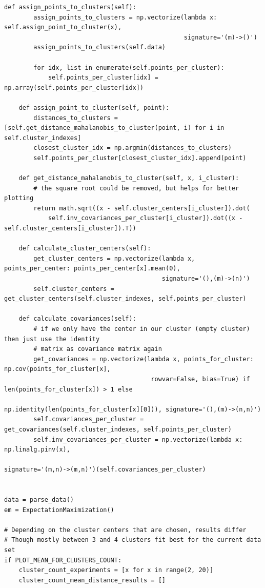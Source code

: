 \begin{lstlisting}[style=py]
    def assign_points_to_clusters(self):
        assign_points_to_clusters = np.vectorize(lambda x: self.assign_point_to_cluster(x),
                                                 signature='(m)->()')
        assign_points_to_clusters(self.data)

        for idx, list in enumerate(self.points_per_cluster):
            self.points_per_cluster[idx] = np.array(self.points_per_cluster[idx])

    def assign_point_to_cluster(self, point):
        distances_to_clusters = [self.get_distance_mahalanobis_to_cluster(point, i) for i in self.cluster_indexes]
        closest_cluster_idx = np.argmin(distances_to_clusters)
        self.points_per_cluster[closest_cluster_idx].append(point)

    def get_distance_mahalanobis_to_cluster(self, x, i_cluster):
        # the square root could be removed, but helps for better plotting
        return math.sqrt((x - self.cluster_centers[i_cluster]).dot(
            self.inv_covariances_per_cluster[i_cluster]).dot((x - self.cluster_centers[i_cluster]).T))

    def calculate_cluster_centers(self):
        get_cluster_centers = np.vectorize(lambda x, points_per_center: points_per_center[x].mean(0),
                                           signature='(),(m)->(n)')
        self.cluster_centers = get_cluster_centers(self.cluster_indexes, self.points_per_cluster)

    def calculate_covariances(self):
        # if we only have the center in our cluster (empty cluster) then just use the identity
        # matrix as covariance matrix again
        get_covariances = np.vectorize(lambda x, points_for_cluster: np.cov(points_for_cluster[x],
                                        rowvar=False, bias=True) if len(points_for_cluster[x]) > 1 else
                                        np.identity(len(points_for_cluster[x][0])), signature='(),(m)->(n,n)')
        self.covariances_per_cluster = get_covariances(self.cluster_indexes, self.points_per_cluster)
        self.inv_covariances_per_cluster = np.vectorize(lambda x: np.linalg.pinv(x),
                                                        signature='(m,n)->(m,n)')(self.covariances_per_cluster)


data = parse_data()
em = ExpectationMaximization()

# Depending on the cluster centers that are chosen, results differ
# Though mostly between 3 and 4 clusters fit best for the current data set
if PLOT_MEAN_FOR_CLUSTERS_COUNT:
    cluster_count_experiments = [x for x in range(2, 20)]
    cluster_count_mean_distance_results = []


\end{lstlisting}
